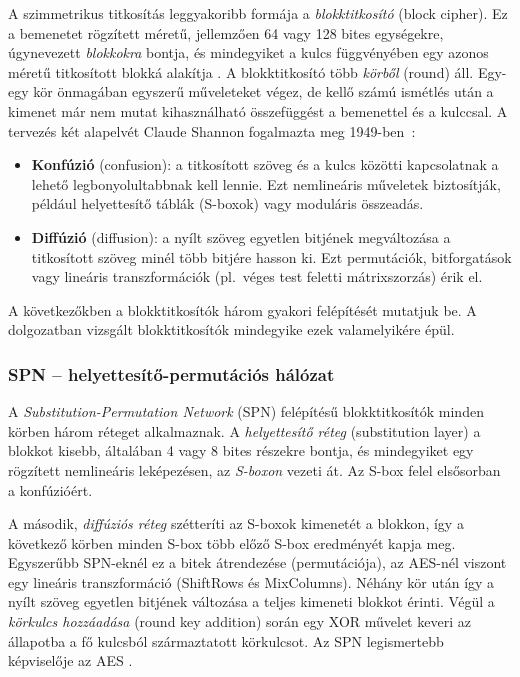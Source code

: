 \documentclass[a4paper,12pt]{report}
\theoremstyle{definition}
\theoremstyle{remark}
\begin{document}
A szimmetrikus titkosítás leggyakoribb formája a \emph{blokktitkosító} (block cipher). Ez a bemenetet rögzített méretű, jellemzően 64 vagy 128 bites egységekre, úgynevezett \emph{blokkokra} bontja, és mindegyiket a kulcs függvényében egy azonos méretű titkosított blokká alakítja \cite{Paar2010}. A blokktitkosító több \emph{körből} (round) áll. Egy-egy kör önmagában egyszerű műveleteket végez, de kellő számú ismétlés után a kimenet már nem mutat kihasználható összefüggést a bemenettel és a kulccsal. A tervezés két alapelvét Claude Shannon fogalmazta meg 1949-ben~\cite{Shannon1949}:

\begin{itemize}
	\item \textbf{Konfúzió} (confusion): a titkosított szöveg és a kulcs közötti kapcsolatnak a lehető legbonyolultabbnak kell lennie. Ezt nemlineáris műveletek biztosítják, például helyettesítő táblák (S-boxok) vagy moduláris összeadás.
	\item \textbf{Diffúzió} (diffusion): a nyílt szöveg egyetlen bitjének megváltozása a titkosított szöveg minél több bitjére hasson ki. Ezt permutációk, bitforgatások vagy lineáris transzformációk (pl.~véges test feletti mátrixszorzás) érik el.
\end{itemize}

A következőkben a blokktitkosítók három gyakori felépítését mutatjuk be. A dolgozatban vizsgált blokktitkosítók mindegyike ezek valamelyikére épül.

\subsubsection{SPN -- helyettesítő-permutációs hálózat}

A \emph{Substitution-Permutation Network} (SPN) felépítésű blokktitkosítók minden körben három réteget alkalmaznak. A \emph{helyettesítő réteg} (substitution layer) a blokkot kisebb, általában 4 vagy 8 bites részekre bontja, és mindegyiket egy rögzített nemlineáris leképezésen, az \emph{S-boxon} vezeti át. Az S-box felel elsősorban a konfúzióért.

A második, \emph{diffúziós réteg} szétteríti az S-boxok kimenetét a blokkon, így a következő körben minden S-box több előző S-box eredményét kapja meg. Egyszerűbb SPN-eknél ez a bitek átrendezése (permutációja), az AES-nél viszont egy lineáris transzformáció (ShiftRows és MixColumns). Néhány kör után így a nyílt szöveg egyetlen bitjének változása a teljes kimeneti blokkot érinti. Végül a \emph{körkulcs hozzáadása} (round key addition) során egy XOR művelet keveri az állapotba a fő kulcsból származtatott körkulcsot. Az SPN legismertebb képviselője az AES \cite{DaemenRijmen2002}.
\end{document}
